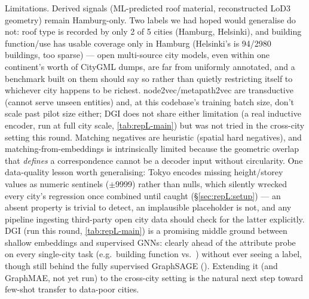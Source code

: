 Limitations. Derived signals (ML-predicted roof material, reconstructed LoD3
geometry) remain Hamburg-only. Two labels we had hoped would generalise do
not: roof type is recorded by only 2 of 5 cities (Hamburg, Helsinki), and
building function/use has usable coverage only in Hamburg (Helsinki's is
94/2980 buildings, too sparse) --- open multi-source city models, even within
one continent's worth of CityGML dumps, are far from uniformly annotated, and
a benchmark built on them should say so rather than quietly restricting itself
to whichever city happens to be richest. node2vec/metapath2vec are
transductive (cannot serve unseen entities) and, at this codebase's training
batch size, don't scale past pilot size either; DGI does not share either
limitation (a real inductive encoder, run at full city scale,
\cref{tab:repL-main}) but was not tried in the cross-city setting this round.
Matching negatives are heuristic (spatial hard negatives), and
matching-from-embeddings is intrinsically limited because the geometric
overlap that \emph{defines} a correspondence cannot be a decoder input
without circularity. One data-quality lesson worth generalising: Tokyo
encodes missing height/storey values as numeric sentinels ($\pm$9999) rather
than nulls, which silently wrecked every
city's regression once combined until caught (\S\ref{sec:repL:setup}) ---
an absent property is trivial to detect, an implausible placeholder is not,
and any pipeline ingesting third-party open city data should check for the
latter explicitly. DGI (run this round, \cref{tab:repL-main}) is a promising
middle ground between shallow embeddings and supervised GNNs: clearly ahead of
the attribute probe on every single-city task (e.g.\ building function
 vs.\ ) without ever seeing a label, though still behind
the fully supervised GraphSAGE (). Extending it (and GraphMAE, not
yet run) to the cross-city setting is the natural next step toward few-shot
transfer to data-poor cities.
